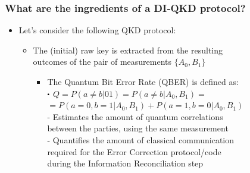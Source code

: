 \documentclass{beamer}
\newcommand\sbullet[1][.5]{\mathbin{\vcenter{\hbox{\scalebox{#1}{$\bullet$}}}}}
\begin{document}
		\begin{frame}
			\frametitle{\large What are the ingredients of a DI‑QKD protocol?}
   
            \begin{itemize}
                \item Let's consider the following QKD protocol:
                \begin{itemize}
                    \item The (initial) raw key is extracted from the resulting\\ outcomes of the pair of measurements $\{{A}_{0}, {B}_{1}\}$
                    \begin{itemize}
                        \item The Quantum Bit Error Rate (QBER) is defined as:\\
                        $\sbullet$ $Q = P(a \neq b | 01) = P(a \neq b | {A}_{0}, {B}_{1}) =$\\
                        \hspace{1.4em}$= P(a = 0, b = 1 | {A}_{0}, {B}_{1}) + P(a = 1, b = 0 | {A}_{0}, {B}_{1})$\\
                        \vspace{1ex}
                        - Estimates the amount of quantum correlations\\
                        \hspace{0.5em}between the parties, using the same measurement\\
                        - Quantifies the amount of classical communication\\\hspace{0.5em}required for the Error Correction protocol/code\\\hspace{0.5em}during the Information Reconciliation step 
                    \end{itemize}
                \end{itemize}
            \end{itemize}
		\end{frame}
\end{document}
